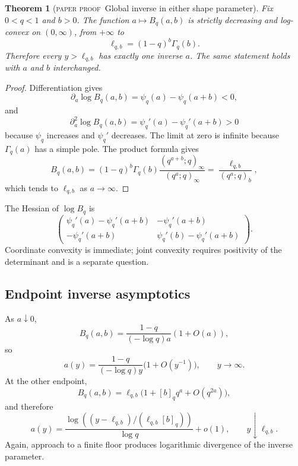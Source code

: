\documentclass[11pt,oneside]{article}
\newtheorem{theorem}{Theorem}[section]
\theoremstyle{definition}
\theoremstyle{remark}
\theoremstyle{plain}
\theoremstyle{definition}
\theoremstyle{remark}
\newcommand{\statusproved}{\textcolor{provedgreen}{\textsc{paper proof}}}
\numberwithin{equation}{section}
\numberwithin{figure}{section}
\numberwithin{table}{section}
\let\reportsubsection\subsection
\let\reportsubsubsection\subsubsection
\let\section\reportsubsection
\let\subsection\reportsubsubsection
\begin{document}
\begin{theorem}[\statusproved\ Global inverse in either shape parameter]
Fix \(0<q<1\) and \(b>0\).  The function \(a\mapsto B_q(a,b)\) is strictly
decreasing and log-convex on \((0,\infty)\), from \(+\infty\) to
\begin{equation}
 \ell_{q,b}=(1-q)^b\Gamma_q(b).
 \label{eq:qbeta-floor}
\end{equation}
Therefore every \(y>\ell_{q,b}\) has exactly one inverse \(a\).  The same
statement holds with \(a\) and \(b\) interchanged.
\end{theorem}
\begin{proof}
Differentiation gives
\[
 \partial_a\log B_q(a,b)=\psi_q(a)-\psi_q(a+b)<0,
\]
and
\[
 \partial_a^2\log B_q(a,b)=\psi_q'(a)-\psi_q'(a+b)>0
\]
because \(\psi_q\) increases and \(\psi_q'\) decreases.  The limit at zero is
infinite because \(\Gamma_q(a)\) has a simple pole.  The product formula gives
\[
 B_q(a,b)=
 (1-q)^b\Gamma_q(b)\frac{(q^{a+b};q)_\infty}{(q^a;q)_\infty}
 =\frac{\ell_{q,b}}{(q^a;q)_b},
\]
which tends to \(\ell_{q,b}\) as \(a\to\infty\).
\end{proof}

The Hessian of \(\log B_q\) is
\[
 \begin{pmatrix}
 \psi_q'(a)-\psi_q'(a+b)&-\psi_q'(a+b)\\
 -\psi_q'(a+b)&\psi_q'(b)-\psi_q'(a+b)
 \end{pmatrix}.
\]
Coordinate convexity is immediate; joint convexity requires positivity of the
determinant and is a separate question.

\section{Endpoint inverse asymptotics}
As \(a\downarrow0\),
\[
 B_q(a,b)=\frac{1-q}{(-\log q)a}(1+O(a)),
\]
so
\begin{equation}
 a(y)=\frac{1-q}{(-\log q)y}\bigl(1+O(y^{-1})\bigr),
 \qquad y\to\infty.
 \label{eq:qbeta-inverse-large}
\end{equation}
At the other endpoint,
\[
 B_q(a,b)=\ell_{q,b}
 \bigl(1+[b]_qq^a+O(q^{2a})\bigr),
\]
and therefore
\begin{equation}
 a(y)=
 \frac{\log\!\left((y-\ell_{q,b})/(\ell_{q,b}[b]_q)\right)}{\log q}
 +o(1),
 \qquad y\downarrow\ell_{q,b}.
 \label{eq:qbeta-inverse-floor}
\end{equation}
Again, approach to a finite floor produces logarithmic divergence of the
inverse parameter.
\end{document}
